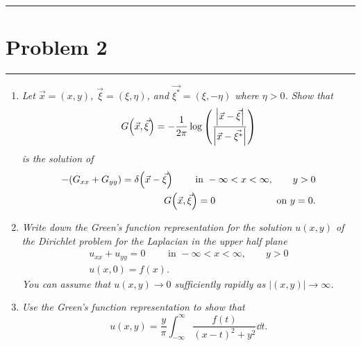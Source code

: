 \documentclass{article} %
\theoremstyle{plain}
\newcommand{\problem}[1]{
\vspace{.375cm}
\begin{minipage}{\textwidth}
    \begin{center}
        \noindent\rule{5cm}{1pt}
    \end{center}
    \section{\bf #1}
    \begin{center}
        \noindent\rule{5cm}{1pt}
    \end{center}
    \vspace{0.25cm}
\end{minipage}
}
\begin{document}
\problem{Problem 2}
\begin{enumerate}[\it (a)]
    \item
        \emph{Let $\vec{x} = (x,y)$, $\vec{\xi} = (\xi, \eta)$, and $\vec{\xi^*} = (\xi, -\eta)$ where $\eta > 0$.  Show that $$G\qty(\vec{x}, \vec{\xi}) = - \frac{1}{2\pi}\log\qty(\frac{\left|\vec{x} - \vec{\xi}\right|}{\left|\vec{x} - \vec{\xi^*}\right|})$$ is the solution of}
        \begin{align*}
            -\qty(G_{xx} + G_{yy}) = \delta\qty(\vec{x} - \vec{\xi}) \qquad \text{ in } - \infty < x < \infty, \qquad y > 0 \\
            G\qty(\vec{x}, \vec{\xi}) = 0 \qquad\qquad\qquad \text{ on } y = 0.
        \end{align*}
    \item
        \emph{Write down the Green's function representation for the solution $u(x,y)$ of the Dirichlet problem for the Laplacian in the upper half plane}
        \begin{align*}
            u_{xx} + u_{yy} = 0 \qquad \text{ in } -\infty < x < \infty, \qquad y > 0 \\
            u(x,0) = f(x).
        \end{align*}
        \emph{You can assume that $u(x,y) \rightarrow 0$ sufficiently rapidly as $|(x,y)| \rightarrow \infty$.}
    \item
        \emph{Use the Green's function representation to show that $$u(x,y) = \frac{y}{\pi}\int_{-\infty}^\infty \frac{f(t)}{(x-t)^2 + y^2}\dd t.$$}
\end{enumerate}
\end{document}
